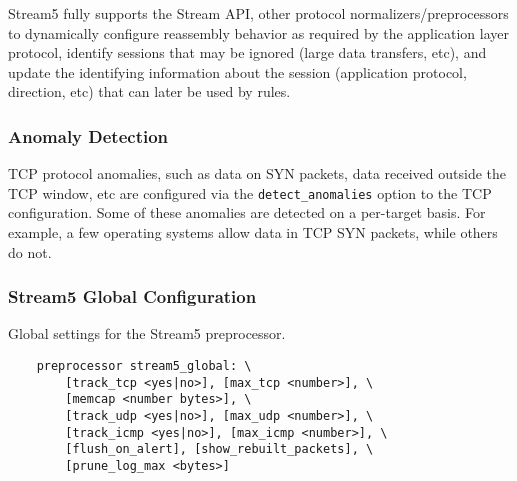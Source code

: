 \documentclass[english]{report}
\begin{document}
Stream5 fully supports the Stream API, other protocol normalizers/preprocessors to
dynamically configure reassembly behavior as required by the application layer
protocol, identify sessions that may be ignored (large data transfers, etc), and
update the identifying information about the session (application protocol, direction,
etc) that can later be used by rules.

\subsubsection{Anomaly Detection}

TCP protocol anomalies, such as data on SYN packets, data received outside the
TCP window, etc are configured via the \texttt{detect\_anomalies} option to the
TCP configuration.  Some of these anomalies are detected on a per-target basis.
For example, a few operating systems allow data in TCP SYN packets, while
others do not.

\subsubsection{Stream5 Global Configuration}

Global settings for the Stream5 preprocessor.

\begin{verbatim}
    preprocessor stream5_global: \
        [track_tcp <yes|no>], [max_tcp <number>], \
        [memcap <number bytes>], \
        [track_udp <yes|no>], [max_udp <number>], \
        [track_icmp <yes|no>], [max_icmp <number>], \
        [flush_on_alert], [show_rebuilt_packets], \
        [prune_log_max <bytes>]
\end{verbatim}
\end{document}
